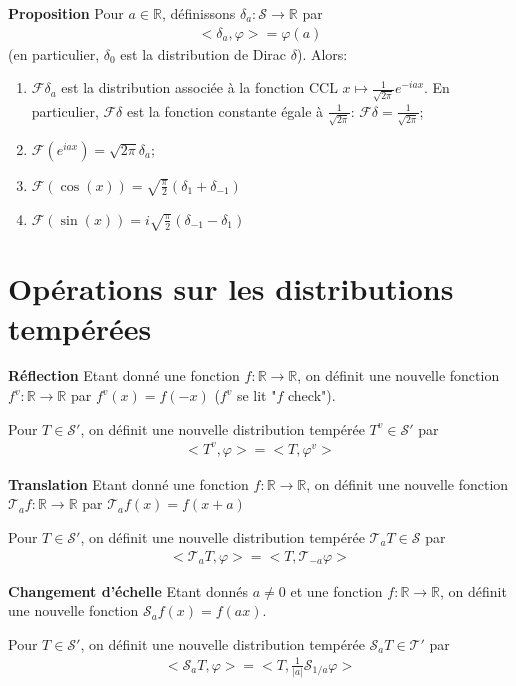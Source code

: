 \textbf{Proposition} Pour $a\in\mathbb R$, définissons $\delta_a:\mathcal S\rightarrow\mathbb R$ par
\begin{eqnarray}
	<\delta_a,\varphi>=\varphi(a)
\end{eqnarray}
(en particulier, $\delta_0$ est la distribution de Dirac $\delta$). Alors:
\begin{enumerate}
	\item $\mathcal F\delta_a$ est la distribution associée à la fonction CCL $x\mapsto\frac{1}{\sqrt{2\pi}}e^{-iax}$. 
En particulier, $\mathcal F\delta$ est la fonction constante égale à $\frac{1}{\sqrt{2\pi}}$: $\mathcal F\delta=\frac{1}{\sqrt{2\pi}}$;
\item $\mathcal F(e^{iax})=\sqrt{2\pi}\delta_a$;
\item $\mathcal F (\cos (x))=\sqrt{\frac{\pi}{2}}(\delta_1+\delta_{-1})$
\item $\mathcal F (\sin (x))=i\sqrt{\frac{\pi}{2}}(\delta_{-1}-\delta_{1})$
\end{enumerate}

\section{Opérations sur les distributions tempérées}
\begin{myDefinition}
	\textbf{Réflection}
	Etant donné une fonction $f:\mathbb R\rightarrow\mathbb R$, on définit une  nouvelle fonction $f^v:\mathbb R\rightarrow\mathbb R$ par $f^v(x)=f(-x)$ ($f^v$ se lit "$f$ check").

Pour $T\in\mathcal S'$, on définit une nouvelle distribution tempérée $T^v\in\mathcal S'$ par
\begin{eqnarray}
	<T^v,\varphi>=<T,\varphi^v> 
\end{eqnarray}
\end{myDefinition}
\begin{myDefinition}
	\textbf{Translation}
	Etant donné une fonction $f:\mathbb R\rightarrow\mathbb R$, on définit une  nouvelle fonction $\mathcal T_a f:\mathbb R\rightarrow\mathbb R$ par $\mathcal T_af(x)=f(x+a)$
	
Pour $T\in\mathcal S'$, on définit une nouvelle distribution tempérée $\mathcal T_aT\in\mathcal S$ par
\begin{eqnarray}
	<\mathcal T_aT,\varphi>=<T,\mathcal T_{-a}\varphi> 
\end{eqnarray}
\end{myDefinition}

\begin{myDefinition}
	\textbf{Changement d'échelle}
	Etant donnés $a\neq0$ et une fonction $f:\mathbb R\rightarrow\mathbb R$, on définit une nouvelle fonction $\mathcal S_af(x)=f(ax)$.
	
Pour $T\in\mathcal S'$, on définit une nouvelle distribution tempérée $\mathcal S_aT\in\mathcal T'$ par
\begin{eqnarray}
	<\mathcal S_aT,\varphi>=<T,\frac{1}{|a|}\mathcal S_{1/a}\varphi>
\end{eqnarray}
\end{myDefinition}

